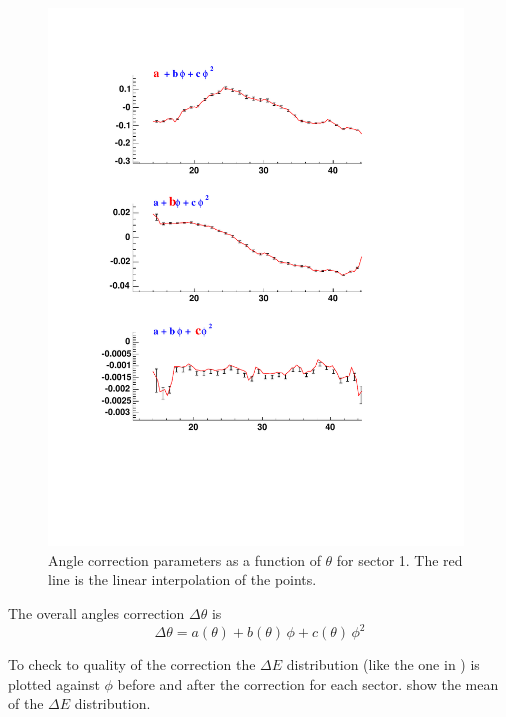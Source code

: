 \begin{figure}[h]
 \begin{center}
  \includegraphics[width = 11cm, bb=0 100 550 720]{data_reduction/kine_corr/img/PART}
  \caption[Angle correction parameters as a function of $\theta$ for sector 1]
          { Angle correction parameters as a function of $\theta$ for sector 1. The red line is the linear
	             interpolation of the points.}
 \label{fig:angle_pars_fit}
 \end{center}
\end{figure}

\cia
The overall angles correction $\Delta\theta$ is \\
$$
\Delta\theta = a(\theta) + b(\theta)\,\phi + c(\theta)\,\phi^2
$$

To check to quality of the correction the $\Delta E$ distribution (like the one in ) is 
plotted against $\phi$ before and after the correction for each sector.  show 
the mean of the $\Delta E$ distribution.

